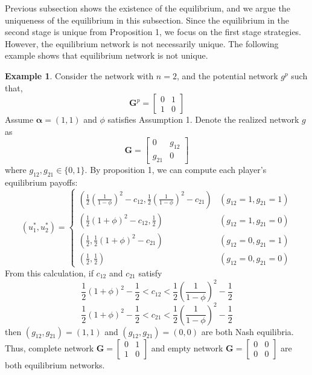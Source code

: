 \documentclass[12pt]{article}
\theoremstyle{definition}
\newtheorem{example}{Example}
\begin{document}
Previous subsection shows the existence of the equilibrium, and we argue the uniqueness of the equilibrium in this subsection.
Since the equilibrium in the second stage is unique from Proposition 1, we focus on the first stage strategies.
However, the equilibrium network is not necessarily unique.
The following example shows that equilibrium network is not unique.

\begin{example}
Consider the network with $n=2$, and the potential network $g^p$ such that,
\[ \bm{G}^p = \left[
	\begin{array}{cc}
		0 & 1 \\
		1 & 0
	\end{array} \right] \]
Assume $\bm{\alpha} = (1, 1)$ and $\phi$ satisfies Assumption 1.
Denote the realized network $g$ as
\[ \bm{G} = \left[
	\begin{array}{cc}
		0 & g_{12} \\
		g_{21} & 0
	\end{array} \right] \]
where $g_{12}, g_{21} \in \{0,1\}$.
By proposition 1, we can compute each player's equilibrium payoffs:
\[ (u_1^*, u_2^*) =
	\begin{cases}
		\left( \frac{1}{2}{\left( \frac{1}{1 - \phi} \right)}^2 - c_{12}, \frac{1}{2}{\left( \frac{1}{1 - \phi} \right)}^2 - c_{21} \right) & (g_{12} = 1, g_{21} = 1) \\
		\left( \frac{1}{2}{(1+\phi)}^2 - c_{12}, \frac{1}{2} \right) & (g_{12} = 1, g_{21} = 0) \\
		\left( \frac{1}{2}, \frac{1}{2}{(1+\phi)}^2 - c_{21} \right) & (g_{12} = 0, g_{21} = 1) \\
		\left( \frac{1}{2}, \frac{1}{2} \right) & (g_{12} = 0, g_{21} = 0)
	\end{cases} \]
From this calculation, if $c_{12}$ and $c_{21}$ satisfy
\[ \frac{1}{2}{(1+\phi)}^2 - \frac{1}{2} < c_{12} < \frac{1}{2}{\left( \frac{1}{1 - \phi} \right)}^2 - \frac{1}{2} \]
\[ \frac{1}{2}{(1+\phi)}^2 - \frac{1}{2} < c_{21} < \frac{1}{2}{\left( \frac{1}{1 - \phi} \right)}^2 - \frac{1}{2} \]
then $(g_{12}, g_{21}) = (1,1)$ and $(g_{12}, g_{21}) = (0,0)$ are both Nash equilibria.
Thus, complete network $\bm{G} = \left[
	\begin{array}{cc}
		0 & 1 \\
		1 & 0
	\end{array} \right]$
and empty network $\bm{G} = \left[
	\begin{array}{cc}
		0 & 0 \\
		0 & 0
	\end{array} \right]$
are both equilibrium networks.
\end{example}
\end{document}
